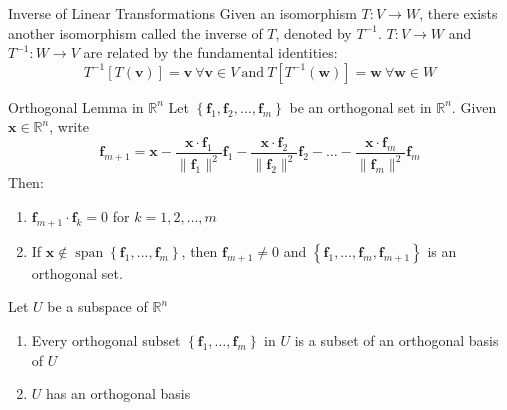 \documentclass[12pt]{article}
\begin{document}
\begin{definition}{Inverse of Linear Transformations}{}
    Given an isomorphism $ T : V \to W $, there exists another isomorphism called the inverse of $ T $, denoted by $ T^{-1} $. $ T : V \to W $ and $ T^{-1} : W \to V $ are related by the fundamental identities:
    \[ T^{-1} \left[ T \left( \mathbf{v} \right) \right] = \mathbf{v} \ \forall \mathbf{v} \in V \ \text{and} \ T \left[ T^{-1} \left( \mathbf{w} \right) \right] = \mathbf{w} \ \forall \mathbf{w} \in W \]
\end{definition}

\begin{lemma}{Orthogonal Lemma in $ \mathbb{R}^n $}{}
    Let $ \left\{ \mathbf{f}_1, \mathbf{f}_2, \dots, \mathbf{f}_m \right\} $ be an orthogonal set in $ \mathbb{R}^n $. Given $ \mathbf{x} \in \mathbb{R}^n $, write
    \[ \mathbf{f}_{m + 1} = \mathbf{x} - \frac{\mathbf{x} \cdot \mathbf{f}_1}{\lVert \mathbf{f}_1 \rVert^2} \mathbf{f}_1 - \frac{\mathbf{x} \cdot \mathbf{f}_2}{\lVert \mathbf{f}_2 \rVert^2} \mathbf{f}_2 - \dots - \frac{\mathbf{x} \cdot \mathbf{f}_m}{\lVert \mathbf{f}_m \rVert^2} \mathbf{f}_m \]
    Then:
    \begin{enumerate}[label=(\roman*)]
        \item $ \mathbf{f}_{m + 1} \cdot \mathbf{f}_k = 0 $ for $ k = 1, 2, \dots, m $
        \item If $ \mathbf{x} \notin \operatorname{span} \left\{ \mathbf{f}_1, \dots, \mathbf{f}_m \right\} $, then $ \mathbf{f}_{m + 1} \neq 0 $ and $ \left\{ \mathbf{f}_1, \dots, \mathbf{f}_m, \mathbf{f}_{m + 1} \right\} $ is an orthogonal set.
    \end{enumerate}
\end{lemma}

\begin{theorem}{}{}
    Let $ U $ be a subspace of $ \mathbb{R}^n $
    \begin{enumerate}[label=(\roman*)]
        \item Every orthogonal subset $ \left\{ \mathbf{f}_1, \dots, \mathbf{f}_m \right\} $ in $ U $ is a subset of an orthogonal basis of $ U $
        \item $ U $ has an orthogonal basis
    \end{enumerate}
\end{theorem}
\end{document}
